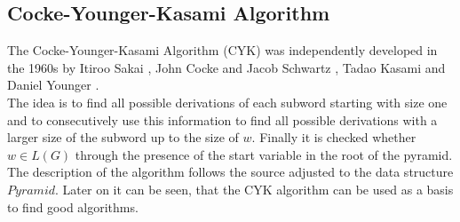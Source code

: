 \subsection{ Cocke-Younger-Kasami Algorithm}
The Cocke-Younger-Kasami Algorithm (CYK) was independently developed in the 1960s by Itiroo Sakai \cite{Sakai.1962}, John Cocke and Jacob Schwartz \cite{JohnCockeJacobT.Schwartz.1970}, Tadao Kasami \cite{Kasami.1966} and Daniel Younger \cite{YOUNGER.1967}.\\
The idea is to find all possible derivations of each subword starting with size one and to consecutively use this information to find all possible derivations with a larger size of the subword up to the size of $w$. Finally it is checked whether $w \in L(G)$ through the presence of the start variable in the root of the pyramid. \\
The description of the algorithm follows the source \cite{Hoffmann.2015} adjusted to the data structure $Pyramid$. 
Later on it can be seen, that the CYK algorithm can be used as a basis to find good algorithms.\\

